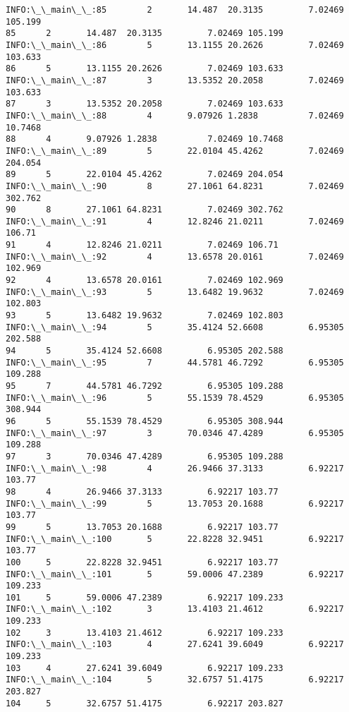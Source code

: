 \documentclass[11pt]{article}
\begin{document}
\begin{Verbatim}[commandchars=\\\{\}]
INFO:\_\_main\_\_:85        2       14.487  20.3135         7.02469 105.199
85      2       14.487  20.3135         7.02469 105.199
INFO:\_\_main\_\_:86        5       13.1155 20.2626         7.02469 103.633
86      5       13.1155 20.2626         7.02469 103.633
INFO:\_\_main\_\_:87        3       13.5352 20.2058         7.02469 103.633
87      3       13.5352 20.2058         7.02469 103.633
INFO:\_\_main\_\_:88        4       9.07926 1.2838          7.02469 10.7468
88      4       9.07926 1.2838          7.02469 10.7468
INFO:\_\_main\_\_:89        5       22.0104 45.4262         7.02469 204.054
89      5       22.0104 45.4262         7.02469 204.054
INFO:\_\_main\_\_:90        8       27.1061 64.8231         7.02469 302.762
90      8       27.1061 64.8231         7.02469 302.762
INFO:\_\_main\_\_:91        4       12.8246 21.0211         7.02469 106.71
91      4       12.8246 21.0211         7.02469 106.71
INFO:\_\_main\_\_:92        4       13.6578 20.0161         7.02469 102.969
92      4       13.6578 20.0161         7.02469 102.969
INFO:\_\_main\_\_:93        5       13.6482 19.9632         7.02469 102.803
93      5       13.6482 19.9632         7.02469 102.803
INFO:\_\_main\_\_:94        5       35.4124 52.6608         6.95305 202.588
94      5       35.4124 52.6608         6.95305 202.588
INFO:\_\_main\_\_:95        7       44.5781 46.7292         6.95305 109.288
95      7       44.5781 46.7292         6.95305 109.288
INFO:\_\_main\_\_:96        5       55.1539 78.4529         6.95305 308.944
96      5       55.1539 78.4529         6.95305 308.944
INFO:\_\_main\_\_:97        3       70.0346 47.4289         6.95305 109.288
97      3       70.0346 47.4289         6.95305 109.288
INFO:\_\_main\_\_:98        4       26.9466 37.3133         6.92217 103.77
98      4       26.9466 37.3133         6.92217 103.77
INFO:\_\_main\_\_:99        5       13.7053 20.1688         6.92217 103.77
99      5       13.7053 20.1688         6.92217 103.77
INFO:\_\_main\_\_:100       5       22.8228 32.9451         6.92217 103.77
100     5       22.8228 32.9451         6.92217 103.77
INFO:\_\_main\_\_:101       5       59.0006 47.2389         6.92217 109.233
101     5       59.0006 47.2389         6.92217 109.233
INFO:\_\_main\_\_:102       3       13.4103 21.4612         6.92217 109.233
102     3       13.4103 21.4612         6.92217 109.233
INFO:\_\_main\_\_:103       4       27.6241 39.6049         6.92217 109.233
103     4       27.6241 39.6049         6.92217 109.233
INFO:\_\_main\_\_:104       5       32.6757 51.4175         6.92217 203.827
104     5       32.6757 51.4175         6.92217 203.827

\end{Verbatim}
\end{document}
